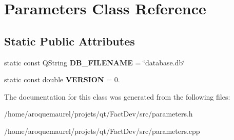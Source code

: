 \hypertarget{classParameters}{\section{Parameters Class Reference}
\label{classParameters}
}
\subsection*{Static Public Attributes}
\begin{DoxyCompactItemize}
\item 
\hypertarget{classParameters_a80b98bd51d910bcc2203afcacbc7df87}{static const Q\-String {\bfseries D\-B\-\_\-\-F\-I\-L\-E\-N\-A\-M\-E} = \char`\"{}database.\-db\char`\"{}}\label{classParameters_a80b98bd51d910bcc2203afcacbc7df87}

\item 
\hypertarget{classParameters_a279ee24140c761de46178daa8960bdc8}{static const double {\bfseries V\-E\-R\-S\-I\-O\-N} = 0.}\label{classParameters_a279ee24140c761de46178daa8960bdc8}

\end{DoxyCompactItemize}


The documentation for this class was generated from the following files\-:\begin{DoxyCompactItemize}
\item 
/home/aroquemaurel/projets/qt/\-Fact\-Dev/src/parameters.\-h\item 
/home/aroquemaurel/projets/qt/\-Fact\-Dev/src/parameters.\-cpp\end{DoxyCompactItemize}
